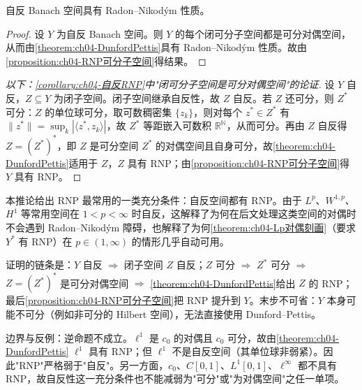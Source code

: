 \documentclass[../../main.tex]{subfiles}%
\begin{document}
\begin{corollary}[Phillips]\label{corollary:ch04-自反RNP}
自反 Banach 空间具有 Radon--Nikodým 性质。
\end{corollary}

\begin{proof}
设 $Y$ 为自反 Banach 空间。则 $Y$ 的每个闭可分子空间都是可分对偶空间，从而由\cref{theorem:ch04-DunfordPettis}具有 Radon--Nikodým 性质。故由\cref{proposition:ch04-RNP可分子空间}得结果。
\end{proof}

\begin{proof}[以下：\cref{corollary:ch04-自反RNP}中"闭可分子空间是可分对偶空间"的论证]
设 $Y$ 自反，$Z\subseteq Y$ 为闭子空间。闭子空间继承自反性，故 $Z$ 自反。若 $Z$ 还可分，则 $Z^*$ 可分：$Z$ 的单位球可分，取可数稠密集 $\{z_k\}$，则对每个 $z^*\in Z^*$ 有 $\|z^*\|=\sup_k|\langle z^*,z_k\rangle|$，故 $Z^*$ 等距嵌入可数积 $\mathbb{R}^{\mathbb{N}}$，从而可分。再由 $Z$ 自反得 $Z=(Z^*)^*$，即 $Z$ 是可分空间 $Z^*$ 的对偶空间且自身可分，故\cref{theorem:ch04-DunfordPettis}适用于 $Z$，$Z$ 具有 RNP；由\cref{proposition:ch04-RNP可分子空间}得 $Y$ 具有 RNP。
\end{proof}

\begin{remark}\label{remark:ch04-自反RNP}
本推论给出 RNP 最常用的一类充分条件：自反空间都有 RNP。由于 $L^p$、$W^{1,p}$、$H^1$ 等常用空间在 $1<p<\infty$ 时自反，这解释了为何在后文处理这类空间的对偶时不会遇到 Radon--Nikodým 障碍，也解释了为何\cref{theorem:ch04-Lp对偶刻画}（要求 $Y^*$ 有 RNP）在 $p\in(1,\infty)$ 的情形几乎自动可用。

证明的链条是：$Y$ 自反 $\Rightarrow$ 闭子空间 $Z$ 自反；$Z$ 可分 $\Rightarrow$ $Z^*$ 可分 $\Rightarrow$ $Z=(Z^*)^*$ 是可分对偶空间 $\Rightarrow$ \cref{theorem:ch04-DunfordPettis}给出 $Z$ 的 RNP；最后\cref{proposition:ch04-RNP可分子空间}把 RNP 提升到 $Y$。末步不可省：$Y$ 本身可能不可分（例如非可分的 Hilbert 空间），无法直接使用 Dunford--Pettis。

边界与反例：逆命题不成立。$\ell^1$ 是 $c_0$ 的对偶且 $c_0$ 可分，故由\cref{theorem:ch04-DunfordPettis} $\ell^1$ 具有 RNP；但 $\ell^1$ 不是自反空间（其单位球非弱紧）。因此"RNP"严格弱于"自反"。另一方面，$c_0$、$C[0,1]$、$L^1[0,1]$、$\ell^\infty$ 都不具有 RNP，故自反性这一充分条件也不能减弱为"可分"或"为对偶空间"之任一单项。
\end{remark}
\end{document}
